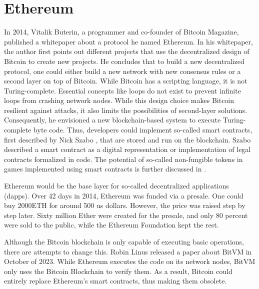 \section{Ethereum}
In 2014, Vitalik Buterin, a programmer and co-founder of Bitcoin Magazine, published a whitepaper about a protocol he named Ethereum.
In his whitepaper, the author first points out different projects that use the decentralized design of Bitcoin to create new projects. 
He concludes that to build a new decentralized protocol, one could either build a new network with new consensus rules or a second layer on top of Bitcoin.
While Bitcoin has a scripting language, it is not Turing-complete. 
Essential concepts like loops do not exist to prevent infinite loops from crashing network nodes. 
While this design choice makes Bitcoin resilient against attacks, it also limits the possibilities of second-layer solutions.
Consequently, he envisioned a new blockchain-based system to execute Turing-complete byte code. 
Thus, developers could implement so-called smart contracts, first described by Nick Szabo \cite{szabo1994}, that are stored and run on the blockchain. \cite{buterin2014}
Szabo described a smart contract as a digital representation or implementation of legal contracts formalized in code.
The potential of so-called non-fungible tokens in games implemented using smart contracts is further discussed in \cite{fowler2021}.

Ethereum would be the base layer for so-called decentralized applications (dapps).
Over 42 days in 2014, Ethereum was funded via a presale. One could buy 2000ETH for around 500 us dollars.
However, the price was raised step by step later.
Sixty million Ether were created for the presale, and only 80 percent were sold to the public, while the Ethereum Foundation kept the rest. \cite{eth_presale}

Although the Bitcoin blockchain is only capable of executing basic operations, there are attempts to change this.
Robin Linus released a paper about BitVM in October of 2023. 
While Ethereum executes the code on its network nodes, BitVM only uses the Bitcoin Blockchain to verify them.
As a result, Bitcoin could entirely replace Ethereum's smart contracts, thus making them obsolete. \cite{linus2023}
